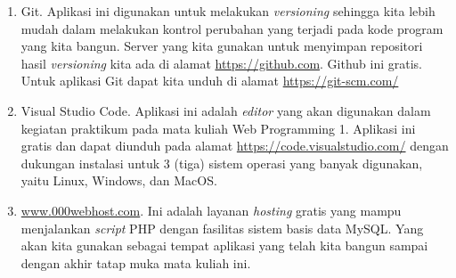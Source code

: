 \begin{enumerate}
	\item Git. Aplikasi ini digunakan untuk melakukan \textit{versioning} sehingga kita lebih mudah dalam melakukan kontrol perubahan yang terjadi pada kode program yang kita bangun. Server yang kita gunakan untuk menyimpan repositori hasil \textit{versioning} kita ada di alamat \url{https://github.com}. Github ini gratis. Untuk aplikasi Git dapat kita unduh di alamat \url{https://git-scm.com/}
	\item Visual Studio Code. Aplikasi ini adalah \textit{editor} yang akan digunakan dalam kegiatan praktikum pada mata kuliah Web Programming 1. Aplikasi ini gratis dan dapat diunduh pada alamat \url{https://code.visualstudio.com/} dengan dukungan instalasi untuk 3 (tiga) sistem operasi yang banyak digunakan, yaitu Linux, Windows, dan MacOS.
	\item \url{www.000webhost.com}. Ini adalah layanan \textit{hosting} gratis yang mampu menjalankan \textit{script} PHP dengan fasilitas sistem basis data MySQL. Yang akan kita gunakan sebagai tempat aplikasi yang telah kita bangun sampai dengan akhir tatap muka mata kuliah ini.
\end{enumerate}